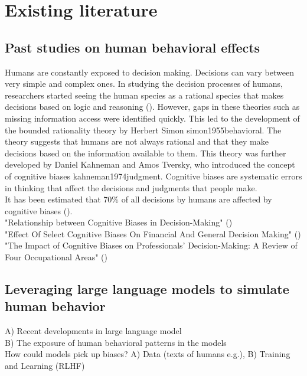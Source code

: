 \section{Existing literature}

\subsection{Past studies on human behavioral effects}
Humans are constantly exposed to decision making. Decisions can vary between very simple and complex ones. In studying the decision processes of humans, researchers started seeing the human species as a rational species that makes decisions based on logic and reasoning (\cite{juarez2018analyzing}). However, gaps in these theories such as missing information access were identified quickly. This led to the development of the bounded rationality theory by Herbert Simon {simon1955behavioral}. The theory suggests that humans are not always rational and that they make decisions based on the information available to them. This theory was further developed by Daniel Kahneman and Amos Tversky, who introduced the concept of cognitive biases {kahneman1974judgment}. Cognitive biases are systematic errors in thinking that affect the decisions and judgments that people make. \\
It has been estimated that 70\% of all decisions by humans are affected by cognitive biases (\cite{juarez2018analyzing}). \\

"Relationship between Cognitive Biases in Decision-Making" (\cite{yeung2023relationship}) \\
"Effect Of Select Cognitive Biases On Financial And General Decision Making" (\cite{gupta2018effect}) \\
"The Impact of Cognitive Biases on Professionals’ Decision-Making: A Review of Four Occupational Areas" (\cite{berthet2022impact}) \\

\subsection{Leveraging large language models to simulate human behavior}
A) Recent developments in large language model\\
B) The exposure of human behavioral patterns in the models\\
How could models pick up biases? A) Data (texts of humans e.g.), B) Training and Learning (RLHF) \\

